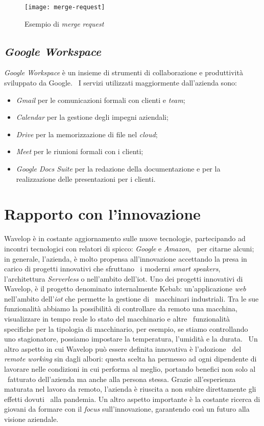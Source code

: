 \begin{figure}[!ht]
  \begin{center}
    \texttt{[image: merge-request]}
    \caption{Esempio di \emph{merge request}}
    \label{fig:mr}
  \end{center}
\end{figure}

\newpage
\subsection{\emph{Google Workspace}}
\emph{Google Workspace} è un insieme di strumenti di collaborazione e produttività sviluppato da Google. \
I servizi utilizzati maggiormente dall'azienda sono:

\begin{itemize}
  \item \emph{Gmail} per le comunicazioni formali con clienti e \emph{team};
  \item \emph{Calendar} per la gestione degli impegni aziendali;
  \item \emph{Drive} per la memorizzazione di file nel \emph{cloud};
  \item \emph{Meet} per le riunioni formali con i clienti;
  \item \emph{Google Docs Suite} per la redazione della documentazione e per la realizzazione delle presentazioni per i clienti.
\end{itemize}

\section{Rapporto con l'innovazione}
Wavelop è in costante aggiornamento sulle nuove tecnologie, partecipando ad incontri tecnologici con relatori di spicco: \emph{Google} e \emph{Amazon}, \
per citarne alcuni; in generale, l'azienda, è molto propensa all'innovazione accettando la presa in carico di progetti innovativi che sfruttano \
i moderni \emph{smart speakers}, l'architettura \emph{Serverless} o nell'ambito dell'\acrfull{iot}. 
Uno dei progetti innovativi di Wavelop, è il progetto denominato internalmente Kebab: un'applicazione \emph{web} nell'ambito dell'\emph{\acrshort{iot}} che permette la gestione di \
macchinari industriali. Tra le sue funzionalità abbiamo la possibilità di controllare da remoto una macchina, visualizzare in tempo reale lo stato del macchinario e altre \
funzionalità specifiche per la tipologia di macchinario, per esempio, se stiamo controllando uno stagionatore, possiamo impostare la temperatura, l'umidità e la durata. \
Un altro aspetto in cui Wavelop può essere definita innovativa è l'adozione \
del \emph{remote working} sin dagli albori: questa scelta ha permesso ad ogni dipendente di lavorare nelle condizioni in cui performa al meglio, portando benefici non solo al \
fatturato dell'azienda ma anche alla persona stessa. Grazie all'esperienza maturata nel lavoro da remoto, l'azienda è riuscita a non subire direttamente gli effetti dovuti \
alla pandemia. Un altro aspetto importante è la costante ricerca di giovani da formare con il \emph{focus} sull'innovazione, garantendo così un futuro alla visione aziendale.